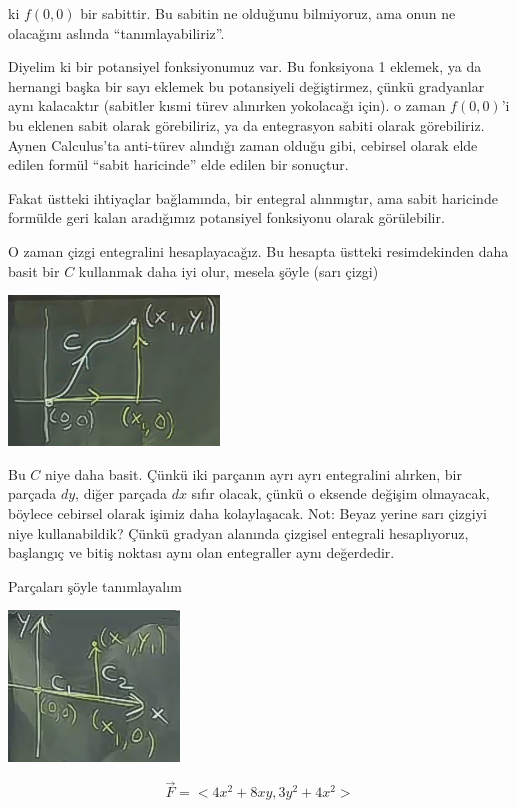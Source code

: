\documentclass[12pt,fleqn]{article}\usepackage{../../common}
\begin{document}
ki $f(0,0)$ bir sabittir. Bu sabitin ne olduğunu bilmiyoruz, ama onun ne
olacağını aslında ``tanımlayabiliriz''. 

Diyelim ki bir potansiyel fonksiyonumuz var. Bu fonksiyona 1 eklemek, ya da
hernangi başka bir sayı eklemek bu potansiyeli değiştirmez, çünkü gradyanlar
aynı kalacaktır (sabitler kısmi türev alınırken yokolacağı için). o zaman
$f(0,0)$'i bu eklenen sabit olarak görebiliriz, ya da entegrasyon sabiti olarak
görebiliriz. Aynen Calculus'ta anti-türev alındığı zaman olduğu gibi, cebirsel
olarak elde edilen formül ``sabit haricinde'' elde edilen bir sonuçtur.

Fakat üstteki ihtiyaçlar bağlamında, bir entegral alınmıştır, ama sabit
haricinde formülde geri kalan aradığımız potansiyel fonksiyonu olarak
görülebilir.

O zaman çizgi entegralini hesaplayacağız. Bu hesapta üstteki resimdekinden daha
basit bir $C$ kullanmak daha iyi olur, mesela şöyle (sarı çizgi)

\includegraphics[height=4cm]{21_3.png}

Bu $C$ niye daha basit. Çünkü iki parçanın ayrı ayrı entegralini alırken, bir
parçada $dy$, diğer parçada $dx$ sıfır olacak, çünkü o eksende değişim
olmayacak, böylece cebirsel olarak işimiz daha kolaylaşacak. Not: Beyaz yerine
sarı çizgiyi niye kullanabildik? Çünkü gradyan alanında çizgisel entegrali
hesaplıyoruz, başlangıç ve bitiş noktası aynı olan entegraller aynı değerdedir.

Parçaları şöyle tanımlayalım

\includegraphics[height=4cm]{21_4.png}

$$ \vec{F} = < 4x^2 + 8xy, 3y^2 + 4x^2 >$$
\end{document}
